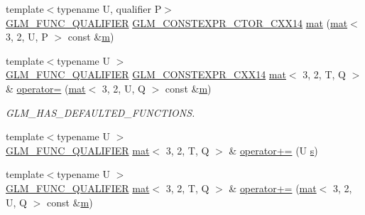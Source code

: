 \begin{DoxyCompactItemize}
\item 
{\footnotesize template$<$typename U, qualifier P$>$ }\\\hyperlink{setup_8hpp_a33fdea6f91c5f834105f7415e2a64407}{G\+L\+M\+\_\+\+F\+U\+N\+C\+\_\+\+Q\+U\+A\+L\+I\+F\+I\+ER} \hyperlink{setup_8hpp_a0900f9145e68bf6061b6f5e7be3fa751}{G\+L\+M\+\_\+\+C\+O\+N\+S\+T\+E\+X\+P\+R\+\_\+\+C\+T\+O\+R\+\_\+\+C\+X\+X14} \hyperlink{structglm_1_1mat_3_013_00_012_00_01_t_00_01_q_01_4_a35a259f91ad5cca9bab10166d9df9d94}{mat} (\hyperlink{structglm_1_1mat}{mat}$<$ 3, 2, U, P $>$ const \&\hyperlink{_s_d_l__opengl__glext_8h_af593500c283bf1a787a6f947f503a5c2}{m})
\item 
{\footnotesize template$<$typename U $>$ }\\\hyperlink{setup_8hpp_a33fdea6f91c5f834105f7415e2a64407}{G\+L\+M\+\_\+\+F\+U\+N\+C\+\_\+\+Q\+U\+A\+L\+I\+F\+I\+ER} \hyperlink{setup_8hpp_a4dd12abf5e1164bc57f3a34671d03844}{G\+L\+M\+\_\+\+C\+O\+N\+S\+T\+E\+X\+P\+R\+\_\+\+C\+X\+X14} \hyperlink{structglm_1_1mat}{mat}$<$ 3, 2, T, Q $>$ \& \hyperlink{structglm_1_1mat_3_013_00_012_00_01_t_00_01_q_01_4_a5665b9b94c9f67c56cc7d9f6ac569ef2}{operator=} (\hyperlink{structglm_1_1mat}{mat}$<$ 3, 2, U, Q $>$ const \&\hyperlink{_s_d_l__opengl__glext_8h_af593500c283bf1a787a6f947f503a5c2}{m})
\begin{DoxyCompactList}\small\item\em G\+L\+M\+\_\+\+H\+A\+S\+\_\+\+D\+E\+F\+A\+U\+L\+T\+E\+D\+\_\+\+F\+U\+N\+C\+T\+I\+O\+NS. \end{DoxyCompactList}\item 
{\footnotesize template$<$typename U $>$ }\\\hyperlink{setup_8hpp_a33fdea6f91c5f834105f7415e2a64407}{G\+L\+M\+\_\+\+F\+U\+N\+C\+\_\+\+Q\+U\+A\+L\+I\+F\+I\+ER} \hyperlink{structglm_1_1mat}{mat}$<$ 3, 2, T, Q $>$ \& \hyperlink{structglm_1_1mat_3_013_00_012_00_01_t_00_01_q_01_4_aa7657886e5ae9f21e9c2c5612d8b174f}{operator+=} (U \hyperlink{_s_d_l__opengl_8h_a4af680a6c683f88ed67b76f207f2e6e4}{s})
\item 
{\footnotesize template$<$typename U $>$ }\\\hyperlink{setup_8hpp_a33fdea6f91c5f834105f7415e2a64407}{G\+L\+M\+\_\+\+F\+U\+N\+C\+\_\+\+Q\+U\+A\+L\+I\+F\+I\+ER} \hyperlink{structglm_1_1mat}{mat}$<$ 3, 2, T, Q $>$ \& \hyperlink{structglm_1_1mat_3_013_00_012_00_01_t_00_01_q_01_4_a5deb395c257fbf8d8ba3dc745fa85f44}{operator+=} (\hyperlink{structglm_1_1mat}{mat}$<$ 3, 2, U, Q $>$ const \&\hyperlink{_s_d_l__opengl__glext_8h_af593500c283bf1a787a6f947f503a5c2}{m})
\item 

\end{DoxyCompactItemize}
